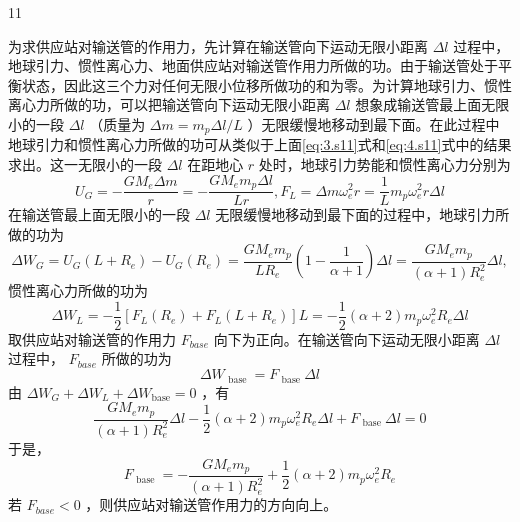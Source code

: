 \begin{solution}{11}
\begin{subsolution}
为求供应站对输送管的作用力，先计算在输送管向下运动无限小距离 $\Delta l$ 过程中，地球引力、惯性离心力、地面供应站对输送管作用力所做的功。由于输送管处于平衡状态，因此这三个力对任何无限小位移所做功的和为零。为计算地球引力、惯性离心力所做的功，可以把输送管向下运动无限小距离 $\Delta l$ 想象成输送管最上面无限小的一段 $\Delta l$ （质量为 $\Delta m = m_p\Delta l / L$ ）无限缓慢地移动到最下面。在此过程中地球引力和惯性离心力所做的功可从类似于上面\eqref{eq:3.s11}式和\eqref{eq:4.s11}式中的结果求出。这一无限小的一段 $\Delta l$ 在距地心 $r$ 处时，地球引力势能和惯性离心力分别为
\begin{equation}
U _ {G} = - \frac {G M _ {e} \Delta m}{r} = - \frac {G M _ {e} m _ {p} \Delta l}{L r}, F _ {L} = \Delta m \omega_ {e} ^ {2} r = \frac {1}{L} m _ {p} \omega_ {e} ^ {2} r \Delta l
\label{eq:13.s11}
\end{equation}
在输送管最上面无限小的一段 $\Delta l$ 无限缓慢地移动到最下面的过程中，地球引力所做的功为
\begin{equation}
\Delta W _ {G} = U _ {G} \left(L + R _ {e}\right) - U _ {G} \left(R _ {e}\right) = \frac {G M _ {e} m _ {p}}{L R _ {e}} \left(1 - \frac {1}{\alpha + 1}\right) \Delta l = \frac {G M _ {e} m _ {p}}{(\alpha + 1) R _ {e} ^ {2}} \Delta l,
\label{eq:14.s11}
\end{equation}
惯性离心力所做的功为
\begin{equation}
\Delta W _ {L} = - \frac {1}{2} \left[ F _ {L} \left(R _ {e}\right) + F _ {L} \left(L + R _ {e}\right) \right] L = - \frac {1}{2} (\alpha + 2) m _ {p} \omega_ {e} ^ {2} R _ {e} \Delta l
\label{eq:15.s11}
\end{equation}
取供应站对输送管的作用力 $F_{base}$ 向下为正向。在输送管向下运动无限小距离 $\Delta l$ 过程中， $F_{base}$ 所做的功为
\begin{equation}
\Delta W _ {\text { base }} = F _ {\text { base }} \Delta l
\label{eq:16.s11}
\end{equation}
由 $\Delta W_{G} + \Delta W_{L} + \Delta W_{\mathrm{base}} = 0$ ，有
\begin{equation}
\frac {G M _ {e} m _ {p}}{(\alpha + 1) R _ {e} ^ {2}} \Delta l - \frac {1}{2} (\alpha + 2) m _ {p} \omega_ {e} ^ {2} R _ {e} \Delta l + F _ {\text { base }} \Delta l = 0
\label{eq:17.s11}
\end{equation}
于是，
\begin{equation}
F _ {\text { base }} = - \frac {G M _ {e} m _ {p}}{(\alpha + 1) R _ {e} ^ {2}} + \frac {1}{2} (\alpha + 2) m _ {p} \omega_ {e} ^ {2} R _ {e}
\label{eq:18.s11}
\end{equation}
若 $F_{base} < 0$ ，则供应站对输送管作用力的方向向上。


\end{subsolution}
\end{solution}
